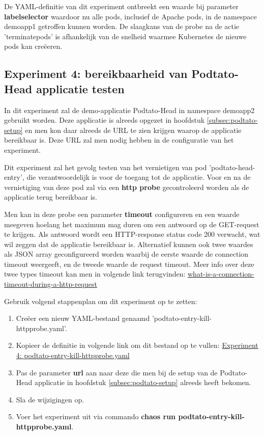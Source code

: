De YAML-definitie van dit experiment ontbreekt een waarde bij parameter {\bf label\textunderscore selector} waardoor nu alle pods, inclusief de Apache pods, in de namespace demoapp1 getroffen kunnen worden. De slaagkans van de probe na de actie 'terminate\textunderscore pods' is afhankelijk van de snelheid waarmee Kubernetes de nieuwe pods kan creëeren.  

\subsection{Experiment 4: bereikbaarheid van Podtato-Head applicatie testen}

In dit experiment zal de demo-applicatie Podtato-Head in namespace demoapp2 gebruikt worden. Deze applicatie is alreeds opgezet in hoofdstuk \ref{subsec:podtato-setup} en men kon daar alreeds de URL te zien krijgen waarop de applicatie bereikbaar is. Deze URL zal men nodig hebben in de configuratie van het experiment.

Dit experiment zal het gevolg testen van het vernietigen van pod 'podtato-head-entry', die verantwoordelijk is voor de toegang tot de applicatie. Voor en na de vernietiging van deze pod zal via een {\bf http probe} gecontroleerd worden als de applicatie terug bereikbaar is. \autocite{ChaosToolkit2022d}
 
Men kan in deze probe een parameter {\bf timeout} configureren en een waarde meegeven hoelang het maximum mag duren om een antwoord op de GET-request te krijgen. Als antwoord wordt een HTTP-response status code 200 verwacht, wat wil zeggen dat de applicatie bereikbaar is. Alternatief kunnen ook twee waardes als JSON array geconfigureerd worden waarbij de eerste waarde de connection timeout weergeeft,
en de tweede waarde de request timeout. Meer info over deze twee types timeout kan men in volgende link terugvinden: \href {https://stackoverflow.com/questions/49704708/what-is-a-connection-timeout-during-a-http-request}{what-is-a-connection-timeout-during-a-http-request}

Gebruik volgend stappenplan om dit experiment op te zetten:
\begin{enumerate}
  \item Creëer een nieuw YAML-bestand genaamd 'podtato-entry-kill-httpprobe.yaml'.
  \item Kopieer de definitie in volgende link om dit bestand op te vullen:
  \href{https://github.com/KenBruggeman/BP\textunderscore 21-22/blob/master/bachelorproef/docs/chaostoolkit%20experimenten/podtato-entry-kill-httpprobe.yaml}{Experiment 4: podtato-entry-kill-httpprobe.yaml}
  \item Pas de parameter {\bf url} aan naar deze die men bij de setup van de Podtato-Head applicatie in hoofdstuk \ref{subsec:podtato-setup} alreeds heeft bekomen.
  \item Sla de wijzigingen op.
  \item Voer het experiment uit via commando {\bf chaos run podtato-entry-kill-httpprobe.yaml}.
\end{enumerate} 

